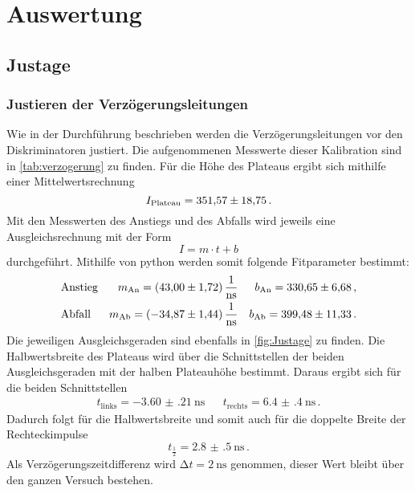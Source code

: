 \section{Auswertung}
\label{sec:Auswertung}

\subsection{Justage}
  \subsubsection{Justieren der Verzögerungsleitungen}
    Wie in der Durchführung beschrieben werden die Verzögerungsleitungen vor den Diskriminatoren justiert. 
    Die aufgenommenen Messwerte dieser Kalibration sind in \autoref{tab:verzogerung} zu finden.
    Für die Höhe des Plateaus ergibt sich mithilfe einer Mittelwertsrechnung
    \begin{equation*}
      I_\text{Plateau} = \num{351.57 \pm 18.75} \, .
    \end{equation*}
    Mit den Messwerten des Anstiegs und des Abfalls wird jeweils eine Ausgleichsrechnung mit der Form
    \begin{equation*}
      I = m \cdot t + b
    \end{equation*}
    durchgeführt.
    Mithilfe von python werden somit folgende Fitparameter bestimmt:
    \begin{align*}
      &\text{Anstieg} &m_\text{An}=\SI{43.00 \pm 1.72}{\per\nano\second}   &&b_\text{An}= \num{330.65 \pm 6.68} \, ,\\
      &\text{Abfall}  &m_\text{Ab}= \SI{-34.87 \pm 1.44}{\per\nano\second}  &&b_\text{Ab}= \num{399.48 \pm 11.33} \, .
    \end{align*}
    Die jeweiligen Ausgleichsgeraden sind ebenfalls in \autoref{fig:Justage} zu finden.
    Die Halbwertsbreite des Plateaus wird über die Schnittstellen der beiden Ausgleichsgeraden mit der halben Plateauhöhe bestimmt.
    Daraus ergibt sich für die beiden Schnittstellen
    \begin{align*}
      t_\text{links} = \SI{-3.60(21)}{\nano\second} && t_\text{rechts}= \SI{6.4(4)}{\nano\second} \, .
    \end{align*}
    Dadurch folgt für die Halbwertsbreite und somit auch für die doppelte Breite der Rechteckimpulse
    \begin{equation*}
      t_\frac{1}{2} = \SI{2.8(5)}{\nano\second} \, .
    \end{equation*}
    Als Verzögerungszeitdifferenz wird $\increment t = \SI{2}{\nano\second}$ genommen, dieser Wert bleibt über den ganzen Versuch bestehen.
